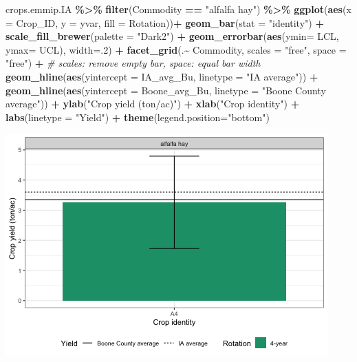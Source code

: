 \documentclass[
]{article}
\newenvironment{Shaded}{\begin{snugshade}}{\end{snugshade}}
\newcommand{\AttributeTok}[1]{\textcolor[rgb]{0.13,0.29,0.53}{#1}}
\newcommand{\CommentTok}[1]{\textcolor[rgb]{0.56,0.35,0.01}{\textit{#1}}}
\newcommand{\DecValTok}[1]{\textcolor[rgb]{0.00,0.00,0.81}{#1}}
\newcommand{\FunctionTok}[1]{\textcolor[rgb]{0.13,0.29,0.53}{\textbf{#1}}}
\newcommand{\NormalTok}[1]{#1}
\newcommand{\SpecialCharTok}[1]{\textcolor[rgb]{0.81,0.36,0.00}{\textbf{#1}}}
\newcommand{\StringTok}[1]{\textcolor[rgb]{0.31,0.60,0.02}{#1}}
\begin{document}
\begin{Shaded}
\begin{Highlighting}[]
\NormalTok{crops.emmip.IA }\SpecialCharTok{\%\textgreater{}\%}
  \FunctionTok{filter}\NormalTok{(Commodity }\SpecialCharTok{==} \StringTok{"alfalfa hay"}\NormalTok{) }\SpecialCharTok{\%\textgreater{}\%}
\FunctionTok{ggplot}\NormalTok{(}\FunctionTok{aes}\NormalTok{(}\AttributeTok{x =}\NormalTok{ Crop\_ID, }\AttributeTok{y =}\NormalTok{ yvar, }\AttributeTok{fill =}\NormalTok{ Rotation))}\SpecialCharTok{+} 
  \FunctionTok{geom\_bar}\NormalTok{(}\AttributeTok{stat =} \StringTok{"identity"}\NormalTok{) }\SpecialCharTok{+}
  \FunctionTok{scale\_fill\_brewer}\NormalTok{(}\AttributeTok{palette =} \StringTok{"Dark2"}\NormalTok{) }\SpecialCharTok{+}
  \FunctionTok{geom\_errorbar}\NormalTok{(}\FunctionTok{aes}\NormalTok{(}\AttributeTok{ymin=}\NormalTok{ LCL, }\AttributeTok{ymax=}\NormalTok{ UCL), }\AttributeTok{width=}\NormalTok{.}\DecValTok{2}\NormalTok{) }\SpecialCharTok{+} 
  \FunctionTok{facet\_grid}\NormalTok{(.}\SpecialCharTok{\textasciitilde{}}\NormalTok{ Commodity, }\AttributeTok{scales =} \StringTok{"free"}\NormalTok{, }\AttributeTok{space =} \StringTok{"free"}\NormalTok{) }\SpecialCharTok{+} \CommentTok{\# scales: remove empty bar, space: equal bar width}
  \FunctionTok{geom\_hline}\NormalTok{(}\FunctionTok{aes}\NormalTok{(}\AttributeTok{yintercept =}\NormalTok{ IA\_avg\_Bu, }\AttributeTok{linetype =} \StringTok{"IA average"}\NormalTok{)) }\SpecialCharTok{+} 
  \FunctionTok{geom\_hline}\NormalTok{(}\FunctionTok{aes}\NormalTok{(}\AttributeTok{yintercept =}\NormalTok{ Boone\_avg\_Bu, }\AttributeTok{linetype =} \StringTok{"Boone County average"}\NormalTok{)) }\SpecialCharTok{+} 
  \FunctionTok{ylab}\NormalTok{(}\StringTok{"Crop yield (ton/ac)"}\NormalTok{) }\SpecialCharTok{+}
  \FunctionTok{xlab}\NormalTok{(}\StringTok{"Crop identity"}\NormalTok{) }\SpecialCharTok{+}
  \FunctionTok{labs}\NormalTok{(}\AttributeTok{linetype =} \StringTok{"Yield"}\NormalTok{) }\SpecialCharTok{+}
  \FunctionTok{theme}\NormalTok{(}\AttributeTok{legend.position=}\StringTok{"bottom"}\NormalTok{) }
\end{Highlighting}
\end{Shaded}

\includegraphics{Crop_yields_bushel_files/figure-latex/unnamed-chunk-8-1.png}
\end{document}
